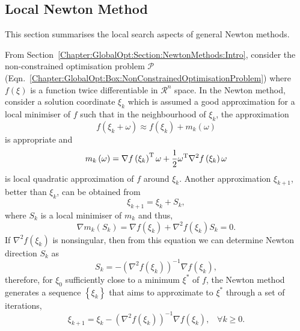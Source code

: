 \subsection{Local Newton Method}\label{Chapter:GlobalOpt:Section:NewtonMethods:LocalNewton}
This section summarises the local search aspects of general Newton methods.

From Section~\ref{Chapter:GlobalOpt:Section:NewtonMethods:Intro}, consider the non-constrained optimisation problem $\mathcal{P}$ (Eqn.~\ref{Chapter:GlobalOpt:Box:NonConstrainedOptimisationProblem}) where $f\left(\xi\right)$ is a function twice differentiable in $\mathcal{R}^{n}$ space. In the Newton method, consider a solution coordinate $\xi_{k}$ which is assumed a good approximation for a local minimiser of $f$ such that in the neighbourhood of $\xi_{k}$, the approximation
\begin{equation}
    f\left(\xi_{k}+\omega\right) \approx f\left(\xi_{k}\right) + m_{k}\left(\omega\right)
\end{equation}
is appropriate and 
\begin{equation}
m_{k}\left(\omega\right) = \nabla f\left(\xi_{k}\right)^{\text{T}}\omega + \displaystyle\frac{1}{2}\omega^{\text{T}}\nabla^{2}f\left(\xi_{k}\right)\omega
\end{equation}
is local quadratic approximation of $f$ around $\xi_{k}$. Another approximation $\xi_{k+1}$, better than $\xi_{k}$, can be obtained from
\begin{displaymath}
   \xi_{k+1} = \xi_{k} + S_{k},
\end{displaymath}
where $S_{k}$ is a local minimiser of $m_{k}$ and thus,
\begin{equation}
   \nabla m_{k}\left(S_{k}\right) = \nabla f\left(\xi_{k}\right) + \nabla^{2} f\left(\xi_{k}\right)S_{k} = 0.
\end{equation}
If $ \nabla^{2} f\left(\xi_{k}\right)$ is nonsingular, then from this equation we can determine Newton direction $S_{k}$ as
\begin{equation}
   S_{k} = - \left(\nabla^{2} f\left(\xi_{k}\right)\right)^{-1}\nabla f\left(\xi_{k}\right),
\end{equation}
therefore, for $\xi_{0}$ sufficiently close to a minimum $\xi^{\ast}$ of $f$, the Newton method generates a sequence $\left\{\xi_{k}\right\}$ that aims to approximate to $\xi^{\ast}$ through a set of iterations,
\begin{equation}
   \xi_{k+1} = \xi_{k} - \left(\nabla^{2} f\left(\xi_{k}\right)\right)^{-1}\nabla f\left(\xi_{k}\right),\;\;\;\forall k\ge 0.\label{Chapter:GlobalOpt:Eqn:NewtonMethod_1}
\end{equation}
